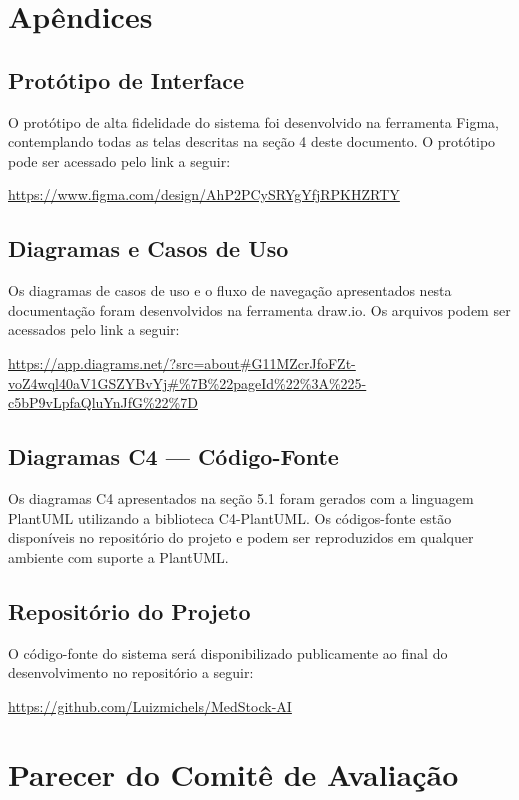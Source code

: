 \documentclass[12pt,a4paper]{article}
\begin{document}
\section{Apêndices}

\subsection{Protótipo de Interface}
O protótipo de alta fidelidade do sistema foi desenvolvido na ferramenta
Figma, contemplando todas as telas descritas na seção 4 deste documento.
O protótipo pode ser acessado pelo link a seguir:
\begin{center}
    \url{https://www.figma.com/design/AhP2PCySRYgYfjRPKHZRTY}
\end{center}

\subsection{Diagramas e Casos de Uso}
Os diagramas de casos de uso e o fluxo de navegação apresentados nesta
documentação foram desenvolvidos na ferramenta draw.io. Os arquivos podem
ser acessados pelo link a seguir:
\begin{center}
    \url{https://app.diagrams.net/?src=about#G11MZcrJfoFZt-voZ4wql40aV1GSZYBvYj#%7B%22pageId%22%3A%225-c5bP9vLpfaQluYnJfG%22%7D}
\end{center}

\subsection{Diagramas C4 — Código-Fonte}
Os diagramas C4 apresentados na seção 5.1 foram gerados com a linguagem
PlantUML utilizando a biblioteca C4-PlantUML. Os códigos-fonte estão
disponíveis no repositório do projeto e podem ser reproduzidos em qualquer
ambiente com suporte a PlantUML.

\subsection{Repositório do Projeto}
O código-fonte do sistema será disponibilizado publicamente ao final do
desenvolvimento no repositório a seguir:
\begin{center}
    \url{https://github.com/Luizmichels/MedStock-AI}
\end{center}

\newpage
\section{Parecer do Comitê de Avaliação}
\end{document}
